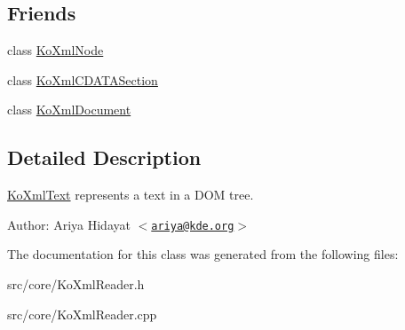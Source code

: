 \subsection*{Friends}
\begin{CompactItemize}
\item 
\hypertarget{classKoXmlText_6c97883f92c7cbf2ecdf17db6cea8297}{
class \hyperlink{classKoXmlText_6c97883f92c7cbf2ecdf17db6cea8297}{KoXmlNode}}
\label{classKoXmlText_6c97883f92c7cbf2ecdf17db6cea8297}

\item 
\hypertarget{classKoXmlText_50466abdb6ebb6b27c8066ac0dd926cc}{
class \hyperlink{classKoXmlText_50466abdb6ebb6b27c8066ac0dd926cc}{KoXmlCDATASection}}
\label{classKoXmlText_50466abdb6ebb6b27c8066ac0dd926cc}

\item 
\hypertarget{classKoXmlText_7f0a67ef52ddc6542737225a82e4f487}{
class \hyperlink{classKoXmlText_7f0a67ef52ddc6542737225a82e4f487}{KoXmlDocument}}
\label{classKoXmlText_7f0a67ef52ddc6542737225a82e4f487}

\end{CompactItemize}


\subsection{Detailed Description}
\hyperlink{classKoXmlText}{KoXmlText} represents a text in a DOM tree. \begin{Desc}
\item[Author:]Ariya Hidayat $<$\href{mailto:ariya@kde.org}{\tt ariya@kde.org}$>$ \end{Desc}


The documentation for this class was generated from the following files:\begin{CompactItemize}
\item 
src/core/KoXmlReader.h\item 
src/core/KoXmlReader.cpp\end{CompactItemize}
